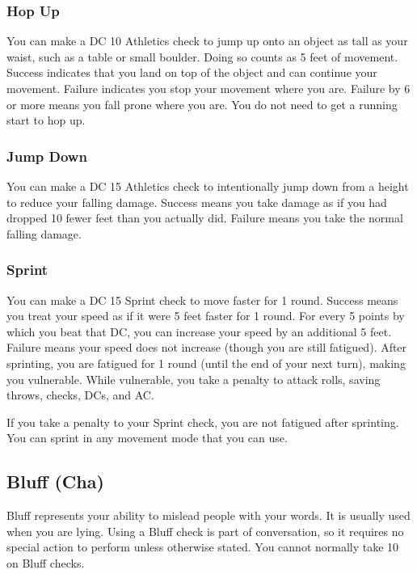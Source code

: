 \subsubsection{Hop Up}
You can make a DC 10 Athletics check to jump up onto an object as tall as your waist, such as a table or small boulder. Doing so counts as 5 feet of movement. Success indicates that you land on top of the object and can continue your movement. Failure indicates you stop your movement where you are. Failure by 6 or more means you fall prone where you are. You do not need to get a running start to hop up.

\subsubsection{Jump Down}
You can make a DC 15 Athletics check to intentionally jump down from a height to reduce your falling damage. Success means you take damage as if you had dropped 10 fewer feet than you actually did. Failure means you take the normal falling damage.

\subsubsection{Sprint}
You can make a DC 15 Sprint check to move faster for 1 round. Success means you treat your speed as if it were 5 feet faster for 1 round. For every 5 points by which you beat that DC, you can increase your speed by an additional 5 feet. Failure means your speed does not increase (though you are still fatigued). After sprinting, you are fatigued for 1 round (until the end of your next turn), making you vulnerable. While vulnerable, you take a  penalty to attack rolls, saving throws, checks, DCs, and AC.

If you take a  penalty to your Sprint check, you are not fatigued after sprinting. You can sprint in any movement mode that you can use.

\subsection{Bluff (Cha)}
Bluff represents your ability to mislead people with your words. It is usually used when you are lying. Using a Bluff check is part of conversation, so it requires no special action to perform unless otherwise stated. You cannot normally take 10 on Bluff checks.

